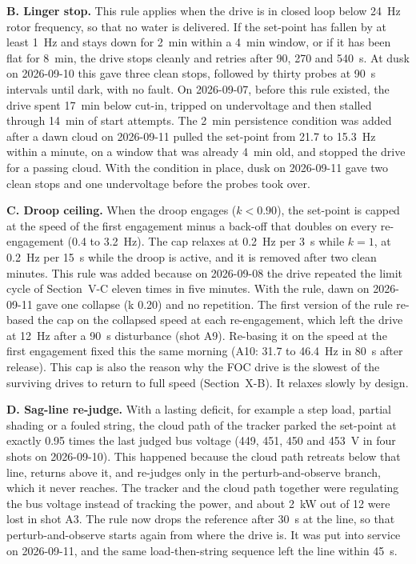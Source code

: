 \documentclass[journal]{IEEEtran}
\begin{document}
\textbf{B. Linger stop.} This rule applies when the drive is in closed loop below 24~Hz rotor frequency, so that no water is delivered. If the set-point has fallen by at least 1~Hz and stays down for 2~min within a 4~min window, or if it has been flat for 8~min, the drive stops cleanly and retries after 90, 270 and 540~s. At dusk on 2026-09-10 this gave three clean stops, followed by thirty probes at 90~s intervals until dark, with no fault. On 2026-09-07, before this rule existed, the drive spent 17~min below cut-in, tripped on undervoltage and then stalled through 14~min of start attempts. The 2~min persistence condition was added after a dawn cloud on 2026-09-11 pulled the set-point from 21.7 to 15.3~Hz within a minute, on a window that was already 4~min old, and stopped the drive for a passing cloud. With the condition in place, dusk on 2026-09-11 gave two clean stops and one undervoltage before the probes took over.

\textbf{C. Droop ceiling.} When the droop engages ($k < 0.90$), the set-point is capped at the speed of the first engagement minus a back-off that doubles on every re-engagement (0.4 to 3.2~Hz). The cap relaxes at 0.2~Hz per 3~s while $k = 1$, at 0.2~Hz per 15~s while the droop is active, and it is removed after two clean minutes. This rule was added because on 2026-09-08 the drive repeated the limit cycle of Section~V-C eleven times in five minutes. With the rule, dawn on 2026-09-11 gave one collapse (k 0.20) and no repetition. The first version of the rule re-based the cap on the collapsed speed at each re-engagement, which left the drive at 12~Hz after a 90~s disturbance (shot A9). Re-basing it on the speed at the first engagement fixed this the same morning (A10: 31.7 to 46.4~Hz in 80~s after release). This cap is also the reason why the FOC drive is the slowest of the surviving drives to return to full speed (Section~X-B). It relaxes slowly by design.

\textbf{D. Sag-line re-judge.} With a lasting deficit, for example a step load, partial shading or a fouled string, the cloud path of the tracker parked the set-point at exactly 0.95 times the last judged bus voltage (449, 451, 450 and 453~V in four shots on 2026-09-10). This happened because the cloud path retreats below that line, returns above it, and re-judges only in the perturb-and-observe branch, which it never reaches. The tracker and the cloud path together were regulating the bus voltage instead of tracking the power, and about 2~kW out of 12 were lost in shot A3. The rule now drops the reference after 30~s at the line, so that perturb-and-observe starts again from where the drive is. It was put into service on 2026-09-11, and the same load-then-string sequence left the line within 45~s.
\end{document}
